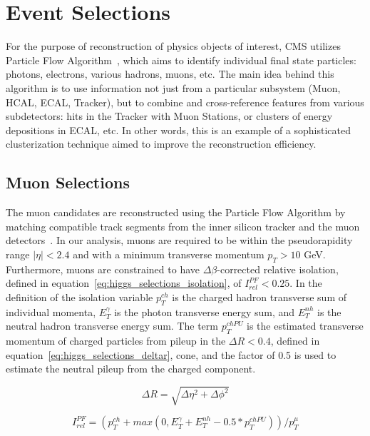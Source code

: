 \section{Event Selections} \label{section:higgs_selections}
For the purpose of reconstruction of physics objects of interest, CMS utilizes Particle Flow Algorithm~\cite{CMS-PAS-PFT-10-002}, which aims to identify individual final state particles: photons, electrons, various hadrons, muons, etc. The main idea behind this algorithm is to use information not just from a particular subsystem (Muon, HCAL, ECAL, Tracker), but to combine and cross-reference features from various subdetectors: hits in the Tracker with Muon Stations, or clusters of energy depositions in ECAL, etc. In other words, this is an example of a sophisticated clusterization technique aimed to improve the reconstruction efficiency.


\subsection{Muon Selections}
The muon candidates are reconstructed using the Particle Flow Algorithm by matching compatible track segments from the inner silicon tracker and the muon detectors~\cite{Chatrchyan:2012xi}. In our analysis, muons are required to be  within the pseudorapidity range $|\eta|<2.4$ and with a minimum transverse momentum $p_{T}>10$ GeV. Furthermore, muons are constrained to have $\Delta \beta$-corrected relative isolation, defined in equation~\ref{eq:higgs_selections_isolation}, of $I_{rel}^{PF}<0.25$. In the definition of the isolation variable $p_{T}^{ch}$ is the charged hadron transverse sum of individual momenta, $E_{T}^{\gamma}$ is the photon transverse energy sum, and $E_{T}^{nh}$ is the neutral hadron transverse energy sum. The term $p_{T}^{chPU}$ is the estimated transverse momentum of charged particles from pileup in the $\Delta R < 0.4$, defined in equation~\ref{eq:higgs_selections_deltar}, cone, and the factor of 0.5 is used to estimate the neutral pileup from the charged component.
\begin{center}
   \begin{equation}
      \label{eq:higgs_selections_deltar}
      {\Delta R} = {\sqrt{\Delta\eta^{2}+\Delta\phi^{2}}}
   \end{equation}
\end{center}
\begin{center}
   \begin{equation}
      \label{eq:higgs_selections_isolation}
      {I_{rel}^{PF}} = {(p_{T}^{ch}+max(0,E_{T}^{\gamma}+E_{T}^{nh}-0.5*p_{T}^{chPU}))/p_{T}^{\mu}}
   \end{equation}
\end{center}

